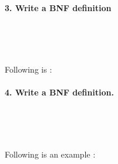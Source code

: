 \documentclass{article}
\begin{document}
	
	
	
	\paragraph{3. Write a BNF definition }\
	
	\rmfamily\
	
		Following is :
		
	\ttfamily
		

	
	
	\rmfamily
	
	\paragraph{4. Write a BNF definition. }\
	
	\rmfamily\

	
		Following is an example :
		
	\ttfamily\

	
\end{document}
